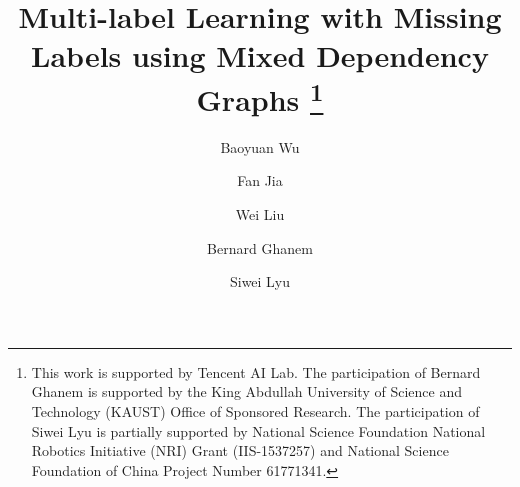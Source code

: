 \documentclass[twocolumn]{svjour3}          %
\begin{document}
\title{Multi-label Learning with Missing Labels using Mixed Dependency Graphs \thanks{This work is supported by Tencent AI Lab. The participation of Bernard Ghanem is supported by the King Abdullah University of Science and Technology (KAUST) Office of Sponsored Research.  
The participation of Siwei Lyu is partially supported by National Science Foundation National Robotics Initiative (NRI) Grant (IIS-1537257) and National Science Foundation of China Project Number 61771341.
}
}


\author{Baoyuan Wu  \and
        Fan Jia \and 
        Wei Liu \and 
        Bernard Ghanem \and 
        Siwei Lyu}





\maketitle
\end{document}

